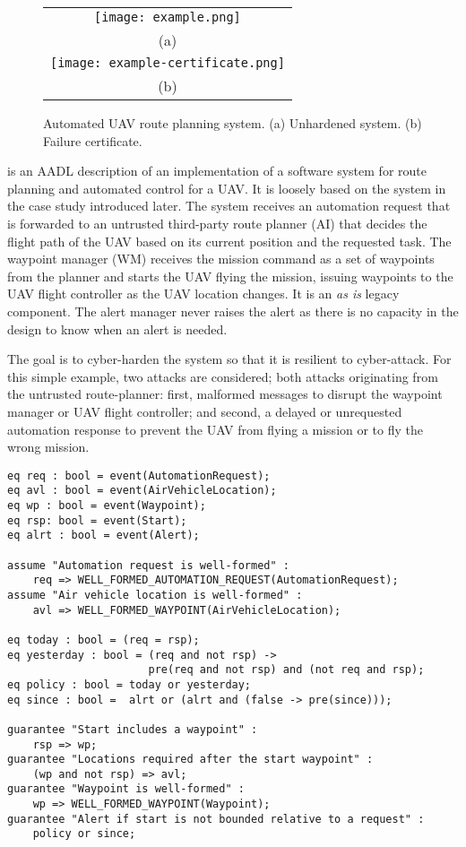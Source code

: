 \begin{figure*}
  \begin{center}
    \begin{tabular}{c}
      \texttt{[image: example.png]} \\
      (a) \\
      \texttt{[image: example-certificate.png]} \\
      (b)
    \end{tabular}
  \end{center}
\caption{Automated UAV route planning system. (a) Unhardened system. (b) Failure certificate.}
\label{fig:example}
\end{figure*}

 is an AADL description of an implementation of a software system for route planning and automated control for a UAV. It is loosely based on the system in the case study introduced later. The system receives an automation request that is forwarded to an untrusted third-party route planner (AI) that decides the flight path of the UAV based on its current position and the requested task. The waypoint manager (WM) receives the mission command as a set of waypoints from the planner and starts the UAV flying the mission, issuing waypoints to the UAV flight controller as the UAV location changes. It is an \emph{as is} legacy component. The alert manager never raises the alert as there is no capacity in the design to know when an alert is needed.

The goal is to cyber-harden the system so that it is resilient to cyber-attack. For this simple example, two attacks are considered; both attacks originating from the untrusted route-planner: first, malformed messages to disrupt the waypoint manager or UAV flight controller; and second, a delayed or unrequested automation response to prevent the UAV from flying a mission or to fly the wrong mission.

\newsavebox{\sw}
\begin{lrbox}{\sw}
\begin{lstlisting}[style=agree]
eq req : bool = event(AutomationRequest);
eq avl : bool = event(AirVehicleLocation);
eq wp : bool = event(Waypoint);
eq rsp: bool = event(Start);
eq alrt : bool = event(Alert);
            
assume "Automation request is well-formed" :
    req => WELL_FORMED_AUTOMATION_REQUEST(AutomationRequest);
assume "Air vehicle location is well-formed" :
    avl => WELL_FORMED_WAYPOINT(AirVehicleLocation);

eq today : bool = (req = rsp);
eq yesterday : bool = (req and not rsp) ->
                      pre(req and not rsp) and (not req and rsp);
eq policy : bool = today or yesterday;
eq since : bool =  alrt or (alrt and (false -> pre(since)));

guarantee "Start includes a waypoint" :
    rsp => wp;
guarantee "Locations required after the start waypoint" :
    (wp and not rsp) => avl;
guarantee "Waypoint is well-formed" :
    wp => WELL_FORMED_WAYPOINT(Waypoint);
guarantee "Alert if start is not bounded relative to a request" :
    policy or since;
\end{lstlisting}
\end{lrbox}

